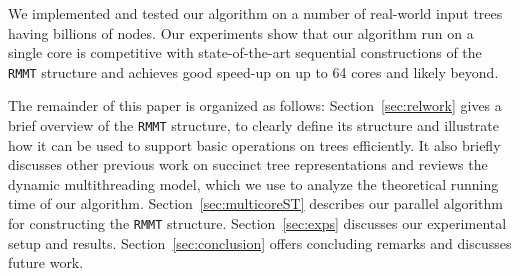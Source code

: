 We implemented and tested our algorithm on a number of real-world input trees
having billions of nodes.
Our experiments show that our algorithm run on a single core is competitive with
state-of-the-art sequential constructions of the {\tt RMMT} structure and
achieves good speed-up on up to 64 cores and likely beyond.

The remainder of this paper is organized as follows:
Section~\ref{sec:relwork} gives a brief overview of the {\tt RMMT} structure,
to clearly define its structure and illustrate how it can be used to support
basic operations on trees efficiently.
It also briefly discusses other previous work on succinct tree representations
and reviews the dynamic multithreading model, which we use to analyze the
theoretical running time of our algorithm.
Section~\ref{sec:multicoreST} describes our parallel algorithm for constructing
the {\tt RMMT} structure.
Section~\ref{sec:exps} discusses our experimental setup and results.
Section~\ref{sec:conclusion} offers concluding remarks and discusses
future work.
